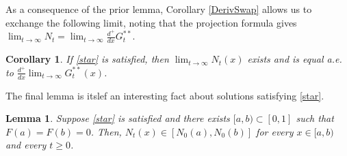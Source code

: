 \documentclass[11pt]{article}
\newtheorem{cor}[thm]{Corollary}
\newtheorem{lemma}[thm]{Lemma}
\numberwithin{equation}{section}
\begin{document}
As a consequence of the prior lemma, Corollary \ref{DerivSwap} allows us to exchange the following limit, noting that the projection formula gives $\lim_{t\to\infty} N_t=\lim_{t\to\infty} \frac{d^+}{dx}G_t^{**}$.

\begin{cor}\label{sufficient-cor}
    If \eqref{star} is satisfied, then $\displaystyle\lim_{t\to\infty} N_t(x)$ exists and is equal a.e. to $\displaystyle\frac{d^+}{dx}\lim_{t\to\infty} G_t^{**}(x)$.
\end{cor}

The final lemma is itslef an interesting fact about solutions satisfying \eqref{star}. 
\begin{lemma}\label{N-contained}
    {Suppose \eqref{star} is satisfied and there exists $[a,b)\subset[0,1]$ such that $F(a)=F(b)=0$. Then, $N_t(x)\in [N_0(a),N_0(b)]$ for every $x\in[a,b)$ and every $t\geq0$}.
\end{lemma}
\end{document}
